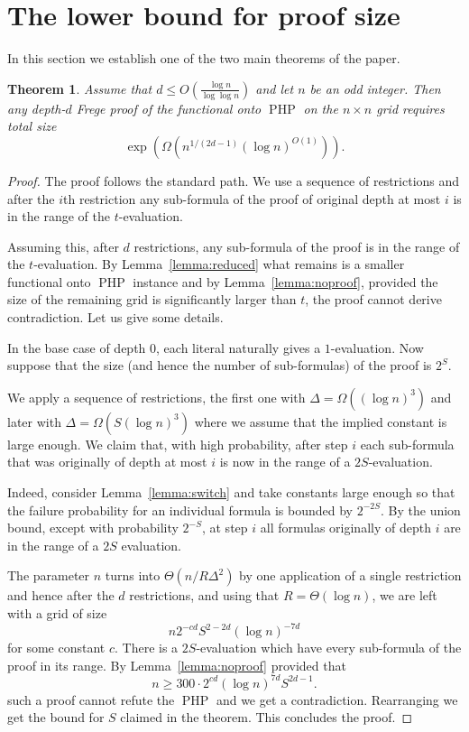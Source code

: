 \documentclass{article}\usepackage[a4paper,margin=20mm]{geometry}
\newtheorem{theorem}{Theorem}\newtheorem{lemma}[theorem]{Lemma}\newtheorem{proposition}[theorem]{Proposition}\newtheorem{corollary}[theorem]{Corollary}\newtheorem{definition}[theorem]{Definition}\newtheorem{claim}[theorem]{Claim}\newtheorem{remark}[theorem]{Remark}\newtheorem{observation}[theorem]{Observation}\newtheorem{conjecture}[theorem]{Conjecture}\newtheorem{example}[theorem]{Example}
\DeclareMathOperator{\PHP}{PHP}
\begin{document}
\section{The lower bound for proof size}\label{sec:size}

In this section we establish one of the two main theorems
of the paper.


\begin{theorem}\label{thm:size}
Assume that $d \leq O(\frac{\log n}{\log {\log n}})$ and let
$n$ be an odd integer. Then any depth-$d$ Frege proof of
the functional onto $\PHP$ on the $n \times n$ grid requires total size
$$
\exp (\Omega (n^{1/(2d-1)} (\log n)^{O(1)})).
$$
\end{theorem}


\begin{proof}
The proof follows the standard path.  We use
a sequence of restrictions and after the $i$th
restriction any sub-formula of the proof
of original depth at most $i$ is in the range of the $t$-evaluation.

Assuming this, after $d$ restrictions, any sub-formula
of the proof is in the range of the $t$-evaluation.
By Lemma~\ref{lemma:reduced} what remains is a smaller
functional onto $\PHP$ instance and
by Lemma~\ref{lemma:noproof}, provided the
size of the remaining grid is significantly larger than
$t$, the proof cannot derive contradiction.  Let us give
some details.

In the base case of depth $0$, each literal naturally gives
a $1$-evaluation.  Now
suppose that the size (and hence the number of sub-formulas)
of the proof is $2^S$.

We apply a sequence of restrictions, the first
one with $\Delta= \Omega ((\log n) ^3)$ and later with
$\Delta= \Omega (S(\log n) ^3)$ where we assume that
the implied constant is large enough.  We claim that,
with high probability, after step $i$ each sub-formula that was originally
of depth at most $i$ is now in the range of a $2S$-evaluation.

Indeed, consider Lemma~\ref{lemma:switch} and take
constants large enough so that the failure probability for
an individual formula is bounded by $2^{-2S}$.  By the
union bound, except with probability $2^{-S}$, at step
$i$ all formulas originally of depth $i$ are
in the range of a $2S$ evaluation.

The parameter $n$ turns into $\Theta (n/R\Delta^2)$ by one
application of a single restriction and
hence after the $d$ restrictions, and using
that $R=\Theta (\log n)$,  we are left with
a grid of size
$$
n 2^{-cd} S^{2-2d} (\log n)^{-7d}
$$
for some constant $c$.  There is 
a $2S$-evaluation which have every sub-formula
of the proof in its range.  By Lemma~\ref{lemma:noproof}
provided that 
$$
n \geq 300 \cdot 2^{cd} (\log n)^{7d} S^{2d-1}.
$$
such a proof cannot refute the $\PHP$ and we get
a contradiction.  Rearranging we get the bound for $S$
claimed in the theorem.
This concludes the proof.
\end{proof}
\end{document}
